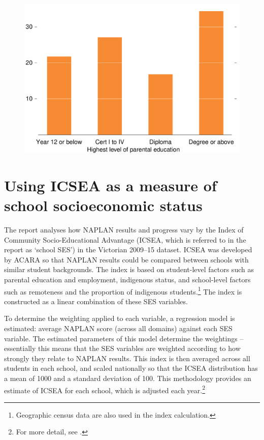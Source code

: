 \begin{figure}[t]
 \includegraphics[width=\columnwidth]{atlas/Parental_ed.pdf}\label{fig:parental_ed}

\end{figure}

\section{Using ICSEA as a measure of school socioeconomic status} \label{sec:icsea}

The report analyses how NAPLAN results and progress vary by the Index of Community Socio-Educational Advantage (ICSEA, which is referred to in the report as `school SES') in the Victorian 2009--15 dataset. ICSEA was developed by ACARA so that NAPLAN results could be compared between schools with similar student backgrounds. The index is based on student-level factors such as parental education and employment, indigenous status, and school-level factors such as remoteness and the proportion of indigenous students.\footnote{Geographic census data are also used in the index calculation.} The index is constructed as a linear combination of these SES variables.

To determine the weighting applied to each variable, a regression model is estimated: average NAPLAN score (across all domains) against each SES variable. The estimated parameters of this model determine the weightings -- essentially this means that the SES variables are weighted according to how strongly they relate to NAPLAN results. This index is then averaged across all students in each school, and scaled nationally so that the ICSEA distribution has a mean of 1000 and a standard deviation of 100. This methodology provides an estimate of ICSEA for each school, which is adjusted each year.\footnote{For more detail, see \textcite{acara2014a}.}

